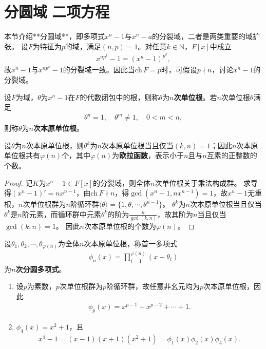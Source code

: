 \documentclass[../../main.tex]{subfiles}%
\begin{document}
\section{分圆域$\,\,$二项方程}

本节介绍**分圆域**，即多项式$x^n-1$与$x^n-a$的分裂域，二者是两类重要的域扩张。
设$F$为特征为$p$的域，满足$(n,p)=1$。对任意$k\in\mathbb{N}$，$F[x]$中成立
\begin{align*}
x^{np^k}-1=(x^n-1)^{p^k},
\end{align*}
故$x^n-1$与$x^{np^k}-1$的分裂域一致。因此当$\mathrm{ch}\,F=p$时，可假设$p\nmid n$，讨论$x^n-1$的分裂域。

\begin{definition}
设$F$为域，$\theta$为$x^n-1$在$F$的代数闭包中的根，则称$\theta$为\textbf{$n$次单位根}。若$n$次单位根$\theta$满足
\begin{align*}
\theta^n=1,\quad \theta^m\neq1,\quad 0<m<n,
\end{align*}
则称$\theta$为\textbf{$n$次本原单位根}。
\end{definition}

\begin{theorem}
设$\theta$为$n$次本原单位根，则$\theta^k$为$n$次本原单位根当且仅当$(k,n)=1$；因此$n$次本原单位根共有$\varphi(n)$个，其中$\varphi(n)$为\textbf{欧拉函数}，表示小于$n$且与$n$互素的正整数的个数。
\end{theorem}
\begin{proof}
记$K$为$x^n-1\in F[x]$的分裂域，则全体$n$次单位根关于乘法构成群。
求导得$(x^n-1)'=nx^{n-1}$，由$\mathrm{ch}\,F\nmid n$，得$\gcd(x^n-1,nx^{n-1})=1$，故$x^n-1$无重根，$n$次单位根群为$n$阶循环群$\langle\theta\rangle=\{1,\theta,\cdots,\theta^{n-1}\}$。
$\theta^k$为$n$次本原单位根当且仅当$\theta^k$是$n$阶元素，而循环群中元素$\theta^k$的阶为$\frac{n}{\gcd(k,n)}$，故其阶为$n$当且仅当$\gcd(k,n)=1$。
因此$n$次本原单位根的个数为$\varphi(n)$。
\end{proof}

\begin{definition}
设$\theta_1,\theta_2,\cdots,\theta_{\varphi(n)}$为全体$n$次本原单位根，称首一多项式
\begin{align*}
\phi_n(x)=\prod\limits_{i=1}^{\varphi(n)}(x-\theta_i)
\end{align*}
为\textbf{$n$次分圆多项式}。
\end{definition}

\begin{examples}
\begin{enumerate}[(1)]
\item 设$p$为素数，$p$次单位根群为$p$阶循环群，故任意非幺元均为$p$次本原单位根，因此
\begin{align*}
\phi_p(x)=x^{p-1}+x^{p-2}+\cdots+1.
\end{align*}
\item $\phi_4(x)=x^2+1$，且
\begin{align*}
x^4-1=(x-1)(x+1)(x^2+1)=\phi_1(x)\phi_2(x)\phi_4(x).
\end{align*}
\end{enumerate}
\end{examples}
\end{document}
